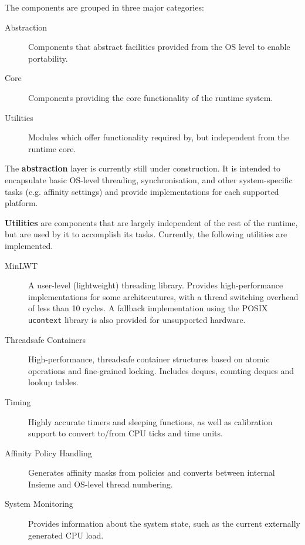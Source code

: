The components are grouped in three major categories:
\begin{description}
  \item[Abstraction] Components that abstract facilities provided from the OS level to enable portability.
  \item[Core] Components providing the core functionality of the runtime system.
  \item[Utilities] Modules which offer functionality required by, but independent from the runtime core.
\end{description}

The \textbf{abstraction} layer is currently still under construction.  It is intended to encapsulate basic OS-level threading, synchronisation, and other system-specific tasks (e.g. affinity settings) and provide implementations for each supported platform.

\textbf{Utilities} are components that are largely independent of the rest of the runtime, but are used by it to accomplish its tasks. Currently, the following utilities are implemented.
\begin{description}
\item[MinLWT] A user-level (lightweight) threading library. Provides high-performance implementations for some architecutures, with a thread switching overhead of less than 10 cycles. A fallback implementation using the POSIX \texttt{ucontext} library is also provided for unsupported hardware.
\item[Threadsafe Containers] High-performance, threadsafe container structures based on atomic operations and fine-grained locking. Includes deques, counting deques and lookup tables.
\item[Timing] Highly accurate timers and sleeping functions, as well as calibration support to convert to/from CPU ticks and time units.
\item[Affinity Policy Handling] Generates affinity masks from policies and converts between internal Insieme and OS-level thread numbering.
\item[System Monitoring] Provides information about the system state, such as the current externally generated CPU load.
\end{description}

